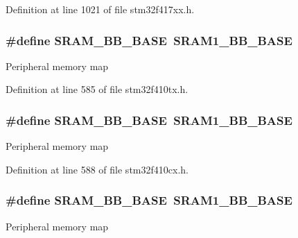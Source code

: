 Definition at line 1021 of file stm32f417xx.\+h.

\subsubsection[{\texorpdfstring{S\+R\+A\+M\+\_\+\+B\+B\+\_\+\+B\+A\+SE}{SRAM_BB_BASE}}]{\setlength{\rightskip}{0pt plus 5cm}\#define S\+R\+A\+M\+\_\+\+B\+B\+\_\+\+B\+A\+SE~{\bf S\+R\+A\+M1\+\_\+\+B\+B\+\_\+\+B\+A\+SE}}\hypertarget{group___peripheral__registers__structures_gad3548b6e2f017f39d399358f3ac98454}{}\label{group___peripheral__registers__structures_gad3548b6e2f017f39d399358f3ac98454}
Peripheral memory map 

Definition at line 585 of file stm32f410tx.\+h.

\subsubsection[{\texorpdfstring{S\+R\+A\+M\+\_\+\+B\+B\+\_\+\+B\+A\+SE}{SRAM_BB_BASE}}]{\setlength{\rightskip}{0pt plus 5cm}\#define S\+R\+A\+M\+\_\+\+B\+B\+\_\+\+B\+A\+SE~{\bf S\+R\+A\+M1\+\_\+\+B\+B\+\_\+\+B\+A\+SE}}\hypertarget{group___peripheral__registers__structures_gad3548b6e2f017f39d399358f3ac98454}{}\label{group___peripheral__registers__structures_gad3548b6e2f017f39d399358f3ac98454}
Peripheral memory map 

Definition at line 588 of file stm32f410cx.\+h.

\subsubsection[{\texorpdfstring{S\+R\+A\+M\+\_\+\+B\+B\+\_\+\+B\+A\+SE}{SRAM_BB_BASE}}]{\setlength{\rightskip}{0pt plus 5cm}\#define S\+R\+A\+M\+\_\+\+B\+B\+\_\+\+B\+A\+SE~{\bf S\+R\+A\+M1\+\_\+\+B\+B\+\_\+\+B\+A\+SE}}\hypertarget{group___peripheral__registers__structures_gad3548b6e2f017f39d399358f3ac98454}{}\label{group___peripheral__registers__structures_gad3548b6e2f017f39d399358f3ac98454}
Peripheral memory map 

